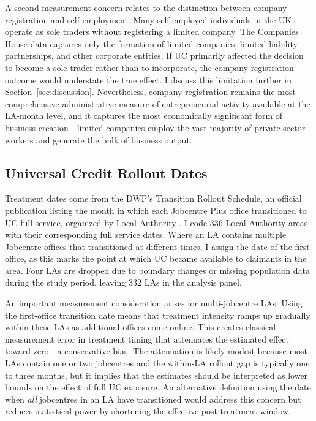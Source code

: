 \documentclass[12pt]{article}
\begin{document}
A second measurement concern relates to the distinction between company registration and self-employment. Many self-employed individuals in the UK operate as sole traders without registering a limited company. The Companies House data captures only the formation of limited companies, limited liability partnerships, and other corporate entities. If UC primarily affected the decision to become a sole trader rather than to incorporate, the company registration outcome would understate the true effect. I discuss this limitation further in Section~\ref{sec:discussion}. Nevertheless, company registration remains the most comprehensive administrative measure of entrepreneurial activity available at the LA-month level, and it captures the most economically significant form of business creation---limited companies employ the vast majority of private-sector workers and generate the bulk of business output.

\subsection{Universal Credit Rollout Dates}

Treatment dates come from the DWP's Transition Rollout Schedule, an official publication listing the month in which each Jobcentre Plus office transitioned to UC full service, organized by Local Authority \citep{dwp2018rollout}. I code 336 Local Authority areas with their corresponding full service dates. Where an LA contains multiple Jobcentre offices that transitioned at different times, I assign the date of the first office, as this marks the point at which UC became available to claimants in the area. Four LAs are dropped due to boundary changes or missing population data during the study period, leaving 332 LAs in the analysis panel.

An important measurement consideration arises for multi-jobcentre LAs. Using the first-office transition date means that treatment intensity ramps up gradually within these LAs as additional offices come online. This creates classical measurement error in treatment timing that attenuates the estimated effect toward zero---a conservative bias. The attenuation is likely modest because most LAs contain one or two jobcentres and the within-LA rollout gap is typically one to three months, but it implies that the estimates should be interpreted as lower bounds on the effect of full UC exposure. An alternative definition using the date when \textit{all} jobcentres in an LA have transitioned would address this concern but reduces statistical power by shortening the effective post-treatment window.
\end{document}
